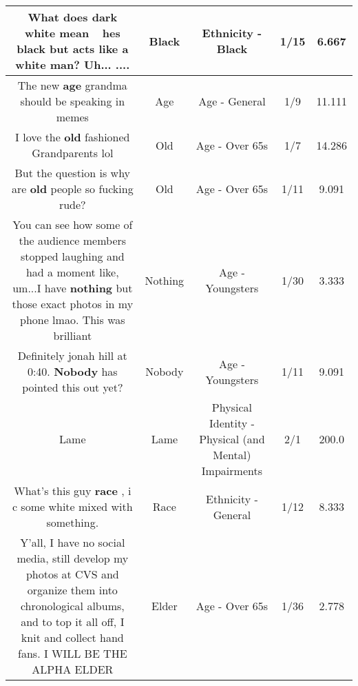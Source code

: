 \documentclass[11pt]{article}
\newlength\mylength
\begin{document}
\begin{center}
\begin{longtable}{|C{.65\mylength}|C{.30\mylength}|C{.12\mylength}|C{.12\mylength}|C{.12\mylength}|}
  \small What does dark white mean🤦🏾‍♀️ hes \textbf{black} but acts like a white man? Uh... ....\normalsize   & Black & Ethnicity - Black & 1/15 & 6.667 \\  \hline
  \small The new \textbf{age} grandma should be speaking in memes\normalsize   & Age & Age - General & 1/9 & 11.111 \\  \hline
  \small I love the \textbf{old} fashioned Grandparents lol\normalsize   & Old & Age - Over 65s & 1/7 & 14.286 \\  \hline
  \small But the question is why are \textbf{old} people so fucking rude?\normalsize   & Old & Age - Over 65s & 1/11 & 9.091 \\  \hline
  \small You can see how some of the audience members stopped laughing and had a moment like, um...I have \textbf{nothing} but those exact photos in my phone lmao. This was brilliant\normalsize   & Nothing & Age - Youngsters & 1/30 & 3.333 \\  \hline
  \small Definitely jonah hill at 0:40. \textbf{Nobody} has pointed this out yet?\normalsize   & Nobody & Age - Youngsters & 1/11 & 9.091 \\  \hline
  \small Lame\normalsize   & Lame & Physical Identity - Physical (and Mental) Impairments & 2/1 & 200.0 \\  \hline
  \small What's this guy \textbf{race} , i c some white mixed with something.\normalsize   & Race & Ethnicity - General & 1/12 & 8.333 \\  \hline
  \small Y'all, I have no social media, still develop my photos at CVS and organize them into chronological albums, and to top it all off, I knit and collect hand fans. I WILL BE THE ALPHA ELDER\normalsize   & Elder & Age - Over 65s & 1/36 & 2.778 \\  \hline

\end{longtable}
\end{center}
\end{document}
